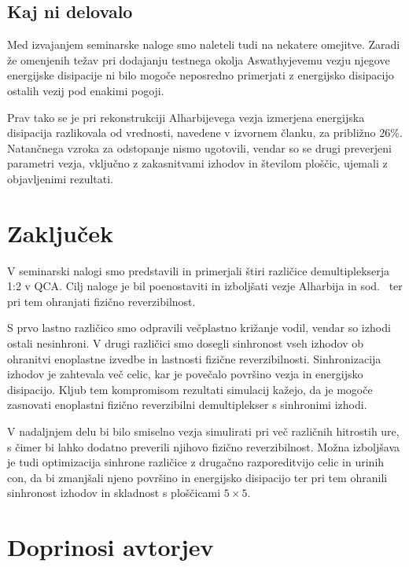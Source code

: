 \subsection{Kaj ni delovalo}
\label{g21:sec:neuspehi}

Med izvajanjem seminarske naloge smo naleteli tudi na nekatere omejitve. Zaradi že omenjenih težav pri dodajanju testnega okolja Aswathyjevemu vezju \cite{g21:aswathy2024} njegove energijske disipacije ni bilo mogoče neposredno primerjati z energijsko disipacijo ostalih vezij pod enakimi pogoji. 

Prav tako se je pri rekonstrukciji Alharbijevega vezja \cite{g21:alharbi2022} izmerjena energijska disipacija razlikovala od vrednosti, navedene v izvornem članku, za približno 26\%. Natančnega vzroka za odstopanje nismo ugotovili, vendar so se drugi preverjeni parametri vezja, vključno z zakasnitvami izhodov in številom ploščic, ujemali z objavljenimi rezultati.

\section{Zaključek}
\label{g21:sec:zakljucek}

V seminarski nalogi smo predstavili in primerjali štiri različice demultiplekserja 1:2 v QCA. Cilj naloge je bil poenostaviti in izboljšati vezje Alharbija in sod.~\cite{g21:alharbi2022} ter pri tem ohranjati fizično reverzibilnost. 

S prvo lastno različico smo odpravili večplastno križanje vodil, vendar so izhodi ostali nesinhroni. V drugi različici smo dosegli sinhronost vseh izhodov ob ohranitvi enoplastne izvedbe in lastnosti fizične reverzibilnosti. Sinhronizacija izhodov je zahtevala več celic, kar je povečalo površino vezja in energijsko disipacijo. Kljub tem kompromisom rezultati simulacij kažejo, da je mogoče zasnovati enoplastni fizično reverzibilni demultiplekser s sinhronimi izhodi. 

V nadaljnjem delu bi bilo smiselno vezja simulirati pri več različnih hitrostih ure, s čimer bi lahko dodatno preverili njihovo fizično reverzibilnost. Možna izboljšava je tudi optimizacija sinhrone različice z drugačno razporeditvijo celic in urinih con, da bi zmanjšali njeno površino in energijsko disipacijo ter pri tem ohranili sinhronost izhodov in skladnost s ploščicami $5\times5$.

\section*{Doprinosi avtorjev}

